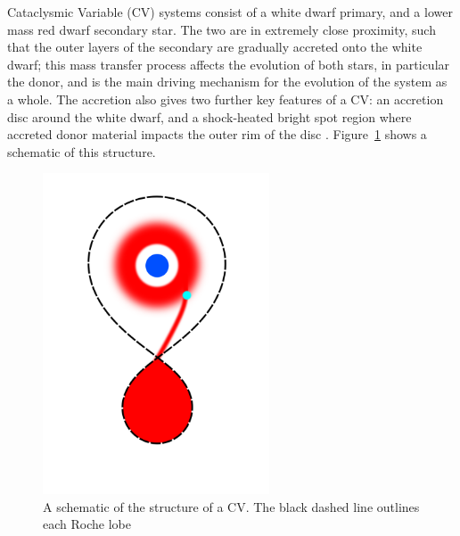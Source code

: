 
\label{chpt:introduction} %



Cataclysmic Variable (CV) systems consist of a white dwarf primary, and a lower mass red dwarf secondary star. The two are in extremely close proximity, such that the outer layers of the secondary are gradually accreted onto the white dwarf; this mass transfer process affects the evolution of both stars, in particular the donor, and is the main driving mechanism for the evolution of the system as a whole.
The accretion also gives two further key features of a CV: an accretion disc around the white dwarf, and a shock-heated bright spot region where accreted donor material impacts the outer rim of the disc \citep{warner1995,hellier2001}. Figure~\ref{fig:introduction:CV schematic} shows a schematic of this structure.

\begin{figure}
    \centering
    \includegraphics[width=0.6\textwidth]{figures/introduction/CV_schematic.png}
    \caption{A schematic of the structure of a CV. The black dashed line outlines each Roche lobe}
    \label{fig:introduction:CV schematic}
\end{figure}

